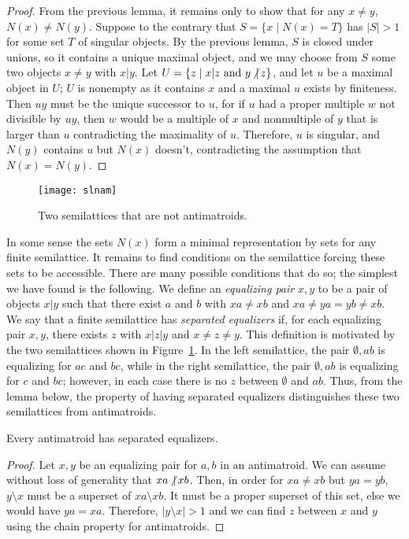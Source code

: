 \documentclass[11pt]{llncs}
\begin{document}
{\begin{proof}
From the previous lemma, it remains only to show that for any $x\ne y$, $N(x)\ne N(y)$. Suppose to the contrary that $S=\{x\mid N(x)=T\}$ has $|S|>1$ for some set $T$ of singular objects. By the previous lemma, $S$ is closed under unions, so it contains a unique maximal object, and we may choose from $S$ some two objects $x\ne y$ with $x|y$. Let $U=\{z\mid x|z\mbox{ and }y\mathop{\not|} z\}$,
and let $u$ be a maximal object in $U$; $U$ is nonempty as it contains $x$ and a maximal $u$ exists by finiteness. Then $uy$ must be the unique successor to $u$, for if $u$ had a proper multiple $w$ not divisible by $uy$, then $w$ would be a multiple of $x$ and nonmultiple of $y$ that is larger than $u$ contradicting the maximality of $u$. Therefore, $u$ is singular, and $N(y)$ contains $u$ but $N(x)$ doesn't, contradicting the assumption that $N(x)=N(y)$.
\end{proof}

\begin{figure}[t]
\centering\texttt{[image: slnam]}
\caption{Two semilattices that are not antimatroids.}
\label{fig:slnam}
\end{figure}

In some sense the sets $N(x)$ form a minimal representation by sets for any finite semilattice. It remains to find conditions on the semilattice forcing these sets to be accessible. There are many possible conditions that do so; the simplest we have found is the following. We define an \emph{equalizing pair} $x,y$ to be a pair of objects $x|y$ such that there exist $a$ and $b$ with $xa\ne xb$ and $xa\ne ya=yb\ne xb$. We say that a finite semilattice has \emph{separated equalizers} if, for each equalizing pair $x,y$, there exists $z$ with $x|z|y$ and $x\ne z\ne y$. This definition is motivated by the two semilattices shown in Figure~\ref{fig:slnam}. In the left semilattice, the pair $\emptyset,ab$ is equalizing for $ac$ and $bc$, while in the right semilattice, the pair $\emptyset,ab$ is equalizing for $c$ and $bc$; however, in each case there is no $z$ between $\emptyset$ and $ab$. Thus, from the lemma below, the property of having separated equalizers distinguishes these two semilattices from antimatroids.

\begin{lemma}
Every antimatroid has separated equalizers.
\end{lemma}

\begin{proof}
Let $x,y$ be an equalizing pair for $a,b$ in an antimatroid. We can assume without loss of generality that $xa\mathop{\not|} xb$. Then, in order for $xa\ne xb$ but $ya=yb$, $y\setminus x$ must be a superset of $xa\setminus xb$. It must be a proper superset of this set, else we would have $ya=xa$. Therefore, $|y\setminus x|>1$ and we can find $z$ between $x$ and $y$ using the chain property for antimatroids.
\end{proof}

}
\end{document}
